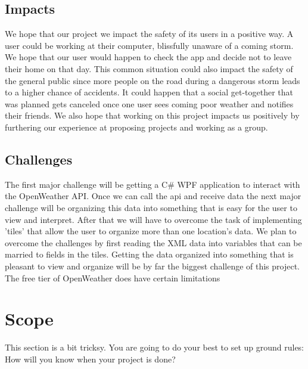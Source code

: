 \documentclass[10pt,conference,onecolumn,compsoc]{IEEEtran}
\begin{document}
\subsection{Impacts}
We hope that our project we impact the safety of its users in a positive way. A user could be working at their computer, blissfully unaware of a coming storm. We hope that our user would happen to check the app and decide not to leave their home on that day. This common situation could also impact the safety of the general public since more people on the road during a dangerous storm leads to a higher chance of accidents. It could happen that a social get-together that was planned gets canceled once one user sees coming poor weather and notifies their friends. We also hope that working on this project impacts us positively by furthering our experience at proposing projects and working as a group.  	



\subsection{Challenges}
	The first major challenge will be getting a C# WPF application to interact with the OpenWeather API. Once we can call the api and receive data the next major challenge will be organizing this data into something that is easy for the user to view and interpret. After that we will have to overcome the task of implementing 'tiles' that allow the user to organize more than one location's data. We plan to overcome the challenges by first reading the XML data into variables that can be married to fields in the tiles. Getting the data organized into something that is pleasant to view and organize will be by far the biggest challenge of this project. The free tier of OpenWeather does have certain limitations


\section{Scope}
This section is a bit tricksy.  You are going to do your best to set up ground rules:  How will you know when your project is done?
\end{document}
